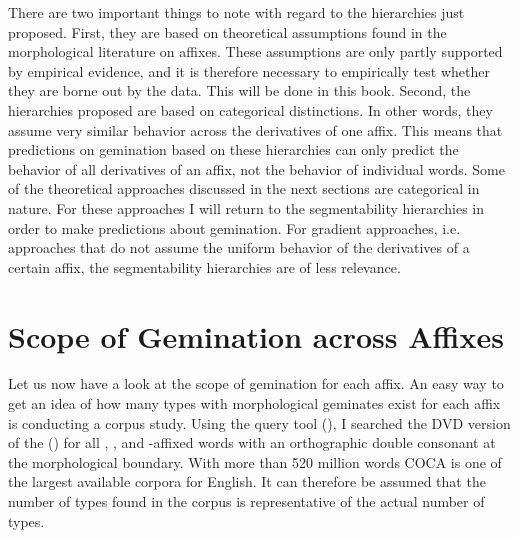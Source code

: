 There are two important things to note with regard to the hierarchies just proposed. First, they are  based on  theoretical assumptions found in the morphological literature on affixes. These assumptions are only partly supported by empirical evidence, and it is therefore necessary to empirically test whether they are borne out by the data. This will be done in this book.
Second, the hierarchies proposed are based on categorical distinctions. In other words, they assume very similar behavior across the derivatives of one affix. This means that predictions on gemination based on these hierarchies can only predict the behavior of all derivatives of an affix, not the behavior of individual words. Some of the theoretical approaches discussed in the next sections are categorical in nature. For these approaches I will return to the segmentability hierarchies in order to make predictions about gemination. For gradient approaches, i.e. approaches that  do not assume the uniform behavior of the derivatives of a certain affix,  the segmentability hierarchies are of less relevance.


\section{Scope of Gemination across Affixes} \label{scope of gemination}

Let us now have a look at the scope of gemination for each affix. An easy way to get an idea of how many types with morphological geminates exist for each affix is conducting a corpus study. Using the query tool  (\citealt{Kunter.2016}), I searched the DVD version of the  (\citealt{Davies.20082014}) for all , ,  and -affixed words with an orthographic double consonant at the morphological boundary. With more than 520 million words COCA is one of the largest available corpora for English. It can therefore be assumed that the number of types found in the corpus is representative of the actual number of types.

